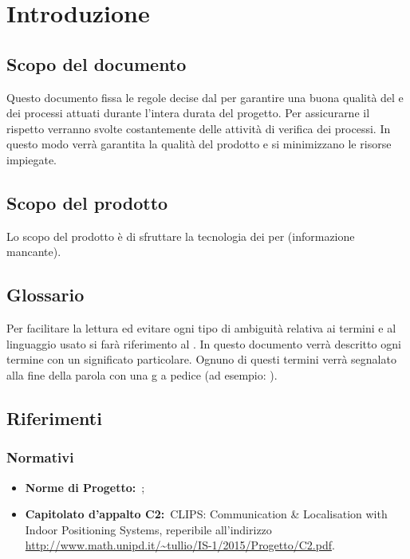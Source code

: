 \documentclass[a4paper]{article}
\newcommand{\importante}[1]{\textbf{#1}} %
\begin{document}
\maketitle

\begin{diario}
\end{diario}
\tableofcontents

\section{Introduzione}
\subsection{Scopo del documento}

Questo documento fissa le regole decise dal  per garantire una buona qualità del  e dei processi attuati durante l'intera durata del progetto. Per assicurarne il rispetto verranno svolte costantemente delle attività di verifica dei processi. In questo modo verrà garantita la qualità del prodotto e si minimizzano le risorse impiegate.

\subsection{Scopo del prodotto}

Lo scopo del prodotto è di sfruttare la tecnologia dei  per (informazione mancante).

\subsection{Glossario}

Per facilitare la lettura ed evitare ogni tipo di ambiguità relativa ai termini e al linguaggio usato si farà riferimento al \Gldoc. In questo documento verrà descritto ogni termine con un significato particolare. Ognuno di questi termini verrà segnalato alla fine della parola con una g a pedice (ad esempio: ).

\subsection{Riferimenti} 
\subsubsection{Normativi}
\begin{itemize}
\item \importante{Norme di Progetto:}\ \NPdoc;
\item \importante{Capitolato d'appalto C2:}\ CLIPS: Communication \& Localisation with Indoor Positioning Systems, reperibile all'indirizzo \url{http://www.math.unipd.it/~tullio/IS-1/2015/Progetto/C2.pdf}.
\end{itemize}
\end{document}
